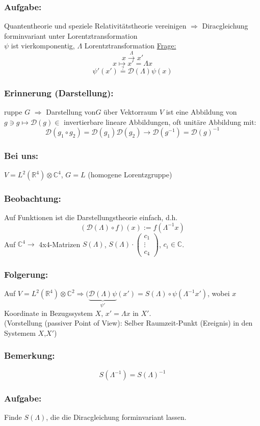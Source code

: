 \documentclass[twoside,a4paper]{scrartcl}
\newcommand{\R}{\mathbb{R}}
\newcommand{\C}{\mathbb{C}}
\newcommand{\D}{\mathcal{D}}
\renewcommand{\1}{\mathds{1}}
\newcommand{\Ra}{\Rightarrow}
\newcommand{\ra}{\rightarrow}
\renewcommand{\L}{\Lambda}
\renewcommand{\R}{\mathbb{R}}
\renewcommand{\C}{\mathbb{C}}
\begin{document}
\subsubsection*{Aufgabe:}
Quantentheorie und speziele Relativitätstheorie vereinigen $\Ra$ Diracgleichung forminvariant unter Lorentztransformation\\
$\psi$ ist vierkomponentig, $\L$ Lorentztransformation \underline{Frage:}\\
$$x \stackrel{\L}{\ra} x'$$
$$x \mapsto x'=\L x$$
$$\psi'(x')\stackrel{?}{=} \D(\L) \psi(x)$$
\subsubsection*{Erinnerung (Darstellung):}
ruppe $G$ $\Ra$ Darstellung von$G$ über Vektorraum $V$ ist eine Abbildung von $g \ni g \mapsto \D(g)\in$ invertierbare lineare Abbildungen, oft unitäre Abbildung mit:
$$\D(g_1\circ g_2)=\D(g_1)\D(g_2) \ra \D(g^{-1})=\D(g)^{-1}$$
\subsubsection*{Bei uns:}
$V=L^2(\R^4)\otimes \C^4$, $G=L$ (homogene Lorentzgruppe)
\subsubsection*{Beobachtung:}
Auf Funktionen ist die Darstellungstheorie einfach, d.h. 
$$(\D(\L)\circ f)(x):=f(\L^{-1}x)$$
Auf $\C^4 \ra$ 4x4-Matrizen $S(\L)$, $S(\L)\cdot \begin{pmatrix}c_1 \\ \vdots \\ c_4\end{pmatrix}$, $c_i \in \C$.
\subsubsection*{Folgerung:}
Auf $V=L^2(\R^4)\otimes \C^2 \Ra (\underbrace{\D(\L)\psi}_{\psi'}(x')=S(\L)\circ \psi(\L^{-1}x')$, wobei $x$ Koordinate in Bezugssystem $X$, $x'=\L x$ in $X'$.\\
(Vorstellung (passiver Point of View): Selber Raumzeit-Punkt (Ereignis) in den Systemem $X$,$X'$)
\subsubsection*{Bemerkung:}
$$S(\L^{-1})=S(\L)^{-1}$$
\subsubsection*{Aufgabe:}
Finde $S(\L)$, die die Diracgleichung forminvariant lassen.
\end{document}

